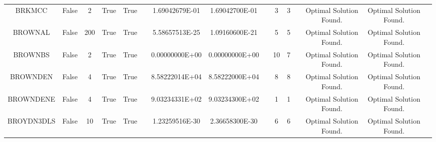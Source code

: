 \begin{longtable}{ccccccccccccccc}
	\cellcolor{default2} BRKMCC& \cellcolor{default2} False& \cellcolor{default2} 2& \cellcolor{default2} True& \cellcolor{default2} True& \cellcolor{header} & \cellcolor{best} 1.69042679E-01& \cellcolor{ok} 1.69042700E-01& \cellcolor{header} & \cellcolor{best} 3& \cellcolor{best} 3& \cellcolor{header} & \cellcolor{default2} Optimal Solution Found.& \cellcolor{default2} Optimal Solution Found.& \cellcolor{header} \\
	\cellcolor{default1} BROWNAL& \cellcolor{default1} False& \cellcolor{default1} 200& \cellcolor{default1} True& \cellcolor{default1} True& \cellcolor{header} & \cellcolor{best} 5.58657513E-25& \cellcolor{ok} 1.09160600E-21& \cellcolor{header} & \cellcolor{best} 5& \cellcolor{best} 5& \cellcolor{header} & \cellcolor{default1} Optimal Solution Found.& \cellcolor{default1} Optimal Solution Found.& \cellcolor{header} \\
	\cellcolor{default2} BROWNBS& \cellcolor{default2} False& \cellcolor{default2} 2& \cellcolor{default2} True& \cellcolor{default2} True& \cellcolor{header} & \cellcolor{best} 0.00000000E+00& \cellcolor{best} 0.00000000E+00& \cellcolor{header} & \cellcolor{ok} 10& \cellcolor{best} 7& \cellcolor{header} & \cellcolor{default2} Optimal Solution Found.& \cellcolor{default2} Optimal Solution Found.& \cellcolor{header} \\
	\cellcolor{default1} BROWNDEN& \cellcolor{default1} False& \cellcolor{default1} 4& \cellcolor{default1} True& \cellcolor{default1} True& \cellcolor{header} & \cellcolor{ok} 8.58222014E+04& \cellcolor{best} 8.58222000E+04& \cellcolor{header} & \cellcolor{best} 8& \cellcolor{best} 8& \cellcolor{header} & \cellcolor{default1} Optimal Solution Found.& \cellcolor{default1} Optimal Solution Found.& \cellcolor{header} \\
	\cellcolor{default2} BROWNDENE& \cellcolor{default2} False& \cellcolor{default2} 4& \cellcolor{default2} True& \cellcolor{default2} True& \cellcolor{header} & \cellcolor{ok} 9.03234331E+02& \cellcolor{best} 9.03234300E+02& \cellcolor{header} & \cellcolor{best} 1& \cellcolor{best} 1& \cellcolor{header} & \cellcolor{default2} Optimal Solution Found.& \cellcolor{default2} Optimal Solution Found.& \cellcolor{header} \\
	\cellcolor{default1} BROYDN3DLS& \cellcolor{default1} False& \cellcolor{default1} 10& \cellcolor{default1} True& \cellcolor{default1} True& \cellcolor{header} & \cellcolor{best} 1.23259516E-30& \cellcolor{ok} 2.36658300E-30& \cellcolor{header} & \cellcolor{best} 6& \cellcolor{best} 6& \cellcolor{header} & \cellcolor{default1} Optimal Solution Found.& \cellcolor{default1} Optimal Solution Found.& \cellcolor{header} \\

\end{longtable}
